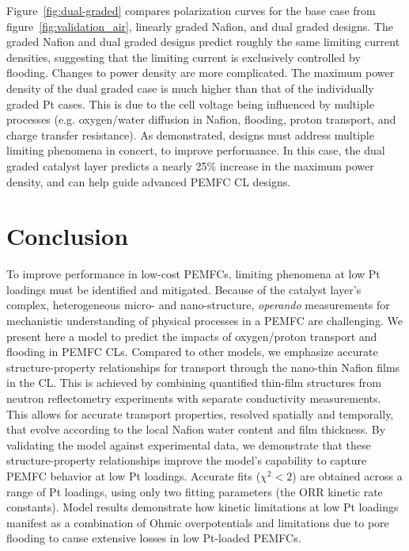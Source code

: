 \documentclass[final,3p,times,twocolumn]{elsarticle}    %
\newcommand{\crr}[1]{\color{red} #1 \color{black}}
\begin{document}
Figure~\ref{fig:dual-graded} compares polarization curves for the base case from figure~\ref{fig:validation_air}, linearly graded Nafion, and dual graded designs. The graded Nafion and dual graded designs predict roughly the same limiting current densities, suggesting that the limiting current is exclusively controlled by flooding. Changes to power density are more complicated. The maximum power density of the dual graded case is much higher than that of the individually graded Pt cases. This is due to the cell voltage being influenced by multiple processes (e.g. oxygen/water diffusion in Nafion, flooding, proton transport, and charge transfer resistance). As demonstrated, designs must address multiple limiting phenomena in concert, to improve performance. In this case, the dual graded catalyst layer predicts a nearly 25\% increase in the maximum power density, and can help guide advanced PEMFC CL designs.


\section{Conclusion}
To improve performance in low-cost PEMFCs, limiting phenomena at low Pt loadings must be identified and mitigated. Because of the catalyst layer's complex, heterogeneous micro- and nano-structure, \emph{operando} measurements for mechanistic understanding of physical processes in a PEMFC are challenging. We present here a model to predict the impacts of oxygen/proton transport and flooding in PEMFC CLs. Compared to other models, we emphasize accurate \crr{structure-property relationships} for transport through the nano-thin Nafion films in the CL. This is achieved by combining quantified thin-film structures from neutron reflectometry experiments with separate conductivity measurements. This allows for accurate transport properties, resolved spatially and temporally, that evolve according to the local Nafion water content and film thickness. By validating the model against experimental data, we demonstrate that these structure-property relationships improve the model's capability to capture PEMFC behavior at low Pt loadings. Accurate fits ($\chi^2 < 2$) are obtained across a range of Pt loadings, using only two fitting parameters (the ORR kinetic rate constants). Model results demonstrate how kinetic limitations at low Pt loadings manifest as a combination of Ohmic overpotentials and limitations due to pore flooding to cause extensive losses in low Pt-loaded PEMFCs. 
\end{document}
